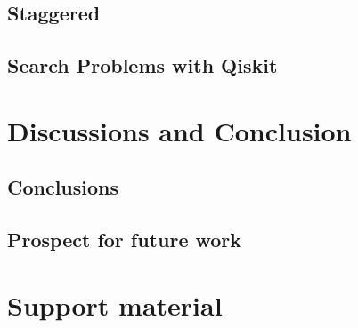 \documentclass[
oneside,
11pt, a4paper,
footinclude=true,
headinclude=true,
cleardoublepage=empty
]{scrbook}
\begin{document}
\section{Staggered}
\section{Search Problems with Qiskit}


\chapter{Discussions and Conclusion}
\section{Conclusions}
\section{Prospect for future work}







\chapter{Support material}
\end{document}
